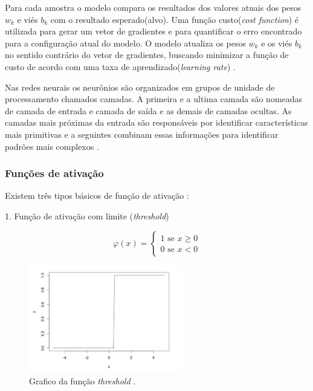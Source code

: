 \documentclass[
	12pt,				%
	openright,			%
	twoside,			%
	a4paper,			%
	english,			%
	french,				%
	spanish,			%
	brazil				%
	]{abntex2}
\begin{document}
Para cada amostra o modelo compara os resultados dos valores atuais dos pesos $w_k$ e viés $b_k$ com o resultado esperado(alvo). Uma função custo(\textit{cost function}) é utilizada para gerar um vetor de gradientes e para quantificar o erro encontrado para a configuração atual do modelo. O modelo atualiza os pesos $w_k$ e os viés $b_k$ no sentido contrário do vetor de gradientes, buscando minimizar a função de custo de acordo com uma taxa de aprendizado(\textit{learning rate}) \cite{marti2017aprendizado}.

Nas redes neurais os neurônios são organizados em grupos de unidade de processamento chamados camadas. A primeira e a ultima camada são nomeadas de camada de entrada e camada de saída e as demais de camadas ocultas. As camadas mais próximas da entrada são responsáveis por identificar características mais primitivas e a seguintes combinam essas informações para identificar padrões mais complexos \cite{marti2017aprendizado}.

\subsubsection{Funções de ativação}

Existem três tipos básicos de função de ativação \cite{haykin1999neural}:

1. Função de ativação com limite (\textit{threshold})

$$\varphi(x) = 
\begin{cases}
1 \text{ se } x \geq 0\\
0 \text{ se } x < \text{0}
\end{cases}$$

\begin{figure}[H]
	\centering
	\includegraphics[width=0.6\textwidth]{figures/threshold_grafico.png}
	\caption{Grafico da função \textit{threshold} \cite{haykin1999neural}.}
	\label{fig:threshold_grafico}
\end{figure}
\end{document}

